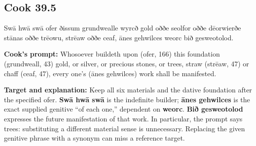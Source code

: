 \par\begin{minipage}{\linewidth}\raggedright
\subsection*{Cook 39.5}

Swā hwā swā ofer ðissum grundwealle wyrcð gold oððe seolfor oððe dēorwierðe stānas oððe trēowu, strēaw oððe ceaf, ānes gehwilces weorc bið gesweotolod.

\textbf{Cook's prompt:} Whosoever buildeth upon (ofer, 166) this foundation (grundweall, 43) gold, or silver, or precious stones, or trees, straw (strēaw, 47) or chaff (ceaf, 47), every one’s (ānes gehwilces) work shall be manifested.

\textbf{Target and explanation:} Keep all six materials and the dative foundation after the specified ofer. \textbf{Swā hwā swā} is the indefinite builder; \textbf{ānes gehwilces} is the exact supplied genitive “of each one,” dependent on \textbf{weorc}. \textbf{Bið gesweotolod} expresses the future manifestation of that work. In particular, the prompt says trees: substituting a different material sense is unnecessary. Replacing the given genitive phrase with a synonym can miss a reference target.

\end{minipage}\par\addvspace{4pt}

